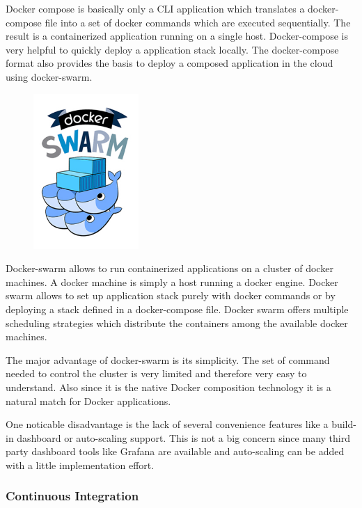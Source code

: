 Docker compose is basically only a CLI application which translates a
docker-compose file into a set of docker commands which are executed
sequentially. The result is a containerized application running on a single
host. Docker-compose is very helpful to quickly deploy a \ms{} application
stack locally. The docker-compose format also provides the basis to deploy a
composed application in the cloud using docker-swarm.\\

\newpage

\begin{figure}
    \includegraphics[width=4cm]{images/dependencies/docker-swarm}
\end{figure}

Docker-swarm allows to run containerized applications on a cluster of docker
machines. A docker machine is simply a host running a docker engine. Docker
swarm allows to set up application stack purely with docker commands or by
deploying a stack defined in a docker-compose file. Docker swarm offers
multiple scheduling strategies which distribute the containers among the
available docker machines.

The major advantage of docker-swarm is its simplicity. The set of command
needed to control the cluster is very limited and therefore very easy to
understand. Also since it is the native Docker composition technology it is
a natural match for Docker applications.

One noticable disadvantage is the lack of several convenience features like
a build-in dashboard or auto-scaling support. This is not a big concern
since many third party dashboard tools like Grafana are available and
auto-scaling can be added with a little implementation effort. 

\subsubsection{Continuous Integration}

